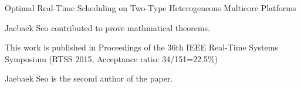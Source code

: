 \begin{cventries}
  \paperentry
    {Optimal Real-Time Scheduling on Two-Type Heterogeneous Multicore Platforms} %
    {} %
    {
        \begin{cvitems} %
        \item {Jaebaek Seo contributed to prove mathmatical theorems.}
        \item{This work is published in Proceedings of the 36th IEEE Real-Time
                Systems Symposium (RTSS 2015, Acceptance ratio: 34/151=22.5\%)}
            \item {Jaebaek Seo is the second author of the paper.}
            \end{cvitems}
    }

\end{cventries}
